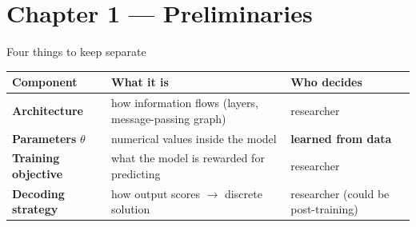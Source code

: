 \documentclass[aspectratio=169,10pt,dvipsnames]{beamer}
\begin{document}
\section{Chapter 1 — Preliminaries}
\begin{frame}{Four things to keep separate}
\small
\renewcommand{\arraystretch}{1.35}
\begin{tabular}{@{}p{3.0cm}p{5.0cm}p{3.2cm}@{}}
\toprule
\textbf{Component} & \textbf{What it is} & \textbf{Who decides} \\
\midrule
\textbf{Architecture} & how information flows (layers, message-passing graph) & researcher \\
\textbf{Parameters} $\theta$ & numerical values inside the model & \textcolor{red!70!black}{\textbf{learned from data}} \\
\textbf{Training objective} & what the model is rewarded for predicting & researcher \\
\textbf{Decoding strategy} & how output scores $\to$ discrete solution & researcher (could be post-training) \\
\bottomrule
\end{tabular}

\bigskip
{}

\end{frame}
\end{document}

